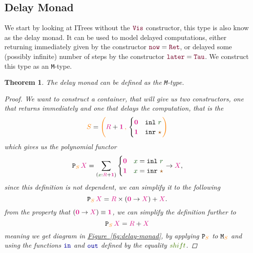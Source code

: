 \documentclass[twoside,11pt,openright]{report}
\theoremstyle{plain} %
\newtheorem{thm}{Theorem}[section]
\theoremstyle{definition}
\theoremstyle{remark}
\newcommand*{\figref}[1]{\hyperref[fig:#1]{Figure~\ref*{fig:#1}}}
\newcommand*{\term}[1]{\textcolor{green!30!black}{#1}} %
\newcommand*{\pathterm}[1]{\textcolor{green!65!red!75!black}{#1}}
\newcommand*{\type}[1]{\textcolor{magenta!90!black}{#1}}
\newcommand*{\container}[1]{\textcolor{orange}{#1}}
\newcommand*{\containerpair}[2]{\ensuremath{\colorlet{savedleftcolor}{.}\color{orange}\left(\color{savedleftcolor}#1\,\textcolor{orange}{\mathbf{,}}\,#2\color{orange}\right)\color{savedleftcolor}}}
\newcommand*{\unit}{\type{\textbf{1}}}
\newcommand*{\empt}{\type{\textbf{0}}}
\newcommand*{\constant}[1]{\textcolor{orange!60!black}{\ensuremath{\mathtt{#1}}}}
\newcommand*{\function}[1]{\textcolor{blue!60!black}{\ensuremath{\mathtt{#1}}}}
\newcommand*{\constructor}[1]{\textcolor{purple!60!black}{\ensuremath{\mathtt{#1}}}}
\newcommand*{\functor}[1]{\ensuremath{\mathbf{\mathtt{#1}}}}
\newcommand*{\unitelem}{\constant{\star}} %
\begin{document}
\subsection{Delay Monad}
We start by looking at ITrees without the \(\constructor{Vis}\) constructor, this type is also know as the delay monad. It can be used to model delayed computations, either returning immediately given by the constructor \(\constructor{now} = \constructor{Ret}\), or delayed some (possibly infinite) number of steps by the constructor \(\constructor{later} = \constructor{Tau}\). We construct this type as an \texttt{M}-type.
\begin{thm}
  The delay monad can be defined as the \texttt{M}-type.
  \begin{proof}
    We want to construct a container, that will give us two constructors, one that returns immediately and one that delays the computation, that is the
    \begin{equation}
      \container{S} = \containerpair{\type{R} +\unit}{\begin{cases} \empt & \mathtt{inl}~\term{r} \\ \unit & \mathtt{inr}~\unitelem \end{cases}}
    \end{equation}
    which gives us the polynomial functor
    \begin{equation}
      \functor{P}_{\container{S}}\,\type{X} = \sum_{(\term{x} : \type{R} + \unit)} \begin{cases} \empt & \term{x} = \mathtt{inl}~\term{r} \\ \unit & \term{x} = \mathtt{inr}~\unitelem \end{cases} \rightarrow \type{X},
    \end{equation}
    since this definition is not dependent, we can simplify it to the following
    \begin{equation}
      \functor{P}_{\container{S}}\,\type{X} = \type{R} \times (\empt \rightarrow \type{X}) + \type{X}.
    \end{equation}
    from the property that \((\empt \rightarrow \type{X}) \equiv \unit\), we can simplify the definition further to
    \begin{equation}
      \functor{P}_{\container{S}}\,\type{X} = \type{R} + \type{X}
    \end{equation}
    meaning we get diagram in \figref{delay-monad}, by applying \(\functor{P}_{\container{S}}\) to \(\mathtt{M}_{\container{S}}\) and using the functions \(\function{in}\) and \(\function{out}\) defined by the equality \(\pathterm{shift}\).

\end{proof}
\end{thm}
\end{document}
